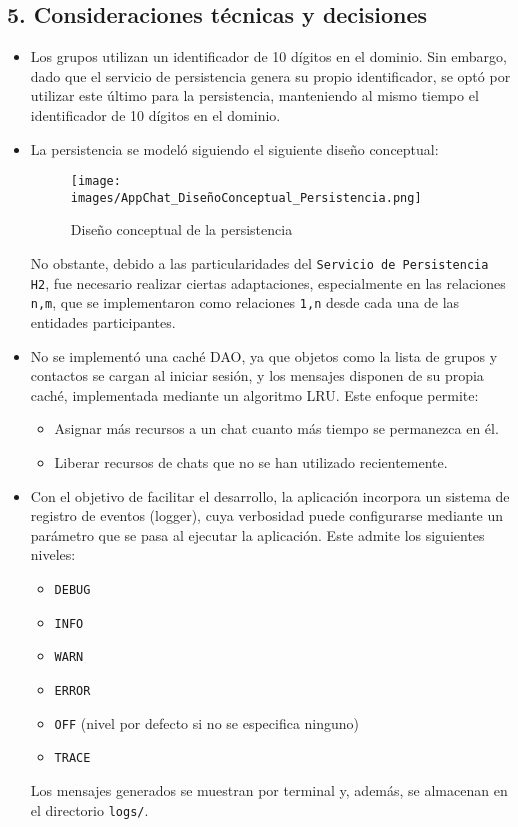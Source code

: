 \subsection*{5. Consideraciones técnicas y decisiones}
\begin{itemize}
    \item Los grupos utilizan un identificador de 10 dígitos en el dominio. Sin embargo, dado que el servicio de persistencia genera su propio identificador, se optó por utilizar este último para la persistencia, 
    manteniendo al mismo tiempo el identificador de 10 dígitos en el dominio.
    \item La persistencia se modeló siguiendo el siguiente diseño conceptual:
    \begin{figure}[H]
        \centering
        \begin{minipage}{0.85\textwidth}
            \centering
            \texttt{[image: images/AppChat\_DiseñoConceptual\_Persistencia.png]}
            \caption*{Diseño conceptual de la persistencia}
        \end{minipage}
    \end{figure}
    No obstante, debido a las particularidades del \texttt{Servicio de Persistencia H2}, fue necesario realizar ciertas adaptaciones, 
    especialmente en las relaciones \texttt{n,m}, que se implementaron como relaciones \texttt{1,n} desde cada una de las entidades participantes.
    \item No se implementó una caché DAO, ya que objetos como la lista de grupos y contactos se cargan al iniciar sesión, y los mensajes disponen de su propia caché, implementada mediante un algoritmo LRU. 
    Este enfoque permite:
    \begin{itemize}
        \item Asignar más recursos a un chat cuanto más tiempo se permanezca en él.
        \item Liberar recursos de chats que no se han utilizado recientemente.
    \end{itemize}
    \item Con el objetivo de facilitar el desarrollo, la aplicación incorpora un sistema de registro de eventos (logger), cuya verbosidad puede configurarse mediante un parámetro que se pasa al ejecutar la aplicación. 
    Este admite los siguientes niveles:
    \begin{itemize}
        \item \texttt{DEBUG}
        \item \texttt{INFO}
        \item \texttt{WARN}
        \item \texttt{ERROR}
        \item \texttt{OFF} (nivel por defecto si no se especifica ninguno)
        \item \texttt{TRACE}
    \end{itemize}
    Los mensajes generados se muestran por terminal y, además, se almacenan en el directorio \texttt{logs/}.

\end{itemize}


\newpage
